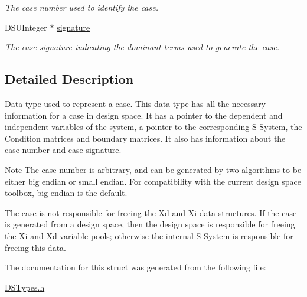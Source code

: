 \begin{DoxyCompactItemize}
\begin{DoxyCompactList}\small\item\em The case number used to identify the case. \item\end{DoxyCompactList}\item 
\hypertarget{struct_d_s_case_a2bfb90f4fc55714f8fd9b9dfbfd21e32}{
DSUInteger $\ast$ \hyperlink{struct_d_s_case_a2bfb90f4fc55714f8fd9b9dfbfd21e32}{signature}}
\label{struct_d_s_case_a2bfb90f4fc55714f8fd9b9dfbfd21e32}

\begin{DoxyCompactList}\small\item\em The case signature indicating the dominant terms used to generate the case. \item\end{DoxyCompactList}\end{DoxyCompactItemize}


\subsection{Detailed Description}
Data type used to represent a case. This data type has all the necessary information for a case in design space. It has a pointer to the dependent and independent variables of the system, a pointer to the corresponding S-\/System, the Condition matrices and boundary matrices. It also has information about the case number and case signature.

\begin{DoxyNote}{Note}
The case number is arbitrary, and can be generated by two algorithms to be either big endian or small endian. For compatibility with the current design space toolbox, big endian is the default.

The case is not responsible for freeing the Xd and Xi data structures. If the case is generated from a design space, then the design space is responsible for freeing the Xi and Xd variable pools; otherwise the internal S-\/System is responsible for freeing this data. 
\end{DoxyNote}


The documentation for this struct was generated from the following file:\begin{DoxyCompactItemize}
\item 
\hyperlink{_d_s_types_8h}{DSTypes.h}\end{DoxyCompactItemize}
